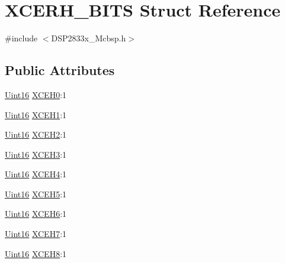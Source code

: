 \hypertarget{struct_x_c_e_r_h___b_i_t_s}{}\section{X\+C\+E\+R\+H\+\_\+\+B\+I\+T\+S Struct Reference}
\label{struct_x_c_e_r_h___b_i_t_s}


{\ttfamily \#include $<$D\+S\+P2833x\+\_\+\+Mcbsp.\+h$>$}

\subsection*{Public Attributes}
\begin{DoxyCompactItemize}
\item 
\hyperlink{_d_s_p2833x___device_8h_a59a9f6be4562c327cbfb4f7e8e18f08b}{Uint16} \hyperlink{struct_x_c_e_r_h___b_i_t_s_ad0342e8bd35c87b15a527aa268030c54}{X\+C\+E\+H0}\+:1
\item 
\hyperlink{_d_s_p2833x___device_8h_a59a9f6be4562c327cbfb4f7e8e18f08b}{Uint16} \hyperlink{struct_x_c_e_r_h___b_i_t_s_a704810aeec0e508faffb1348b2a2c13f}{X\+C\+E\+H1}\+:1
\item 
\hyperlink{_d_s_p2833x___device_8h_a59a9f6be4562c327cbfb4f7e8e18f08b}{Uint16} \hyperlink{struct_x_c_e_r_h___b_i_t_s_a83262ec8531262f849cb4bcf2aecf24a}{X\+C\+E\+H2}\+:1
\item 
\hyperlink{_d_s_p2833x___device_8h_a59a9f6be4562c327cbfb4f7e8e18f08b}{Uint16} \hyperlink{struct_x_c_e_r_h___b_i_t_s_a58b19077363fb579fc56406a2c61d3a1}{X\+C\+E\+H3}\+:1
\item 
\hyperlink{_d_s_p2833x___device_8h_a59a9f6be4562c327cbfb4f7e8e18f08b}{Uint16} \hyperlink{struct_x_c_e_r_h___b_i_t_s_a6bb73949b5e9b7d15824051825657d62}{X\+C\+E\+H4}\+:1
\item 
\hyperlink{_d_s_p2833x___device_8h_a59a9f6be4562c327cbfb4f7e8e18f08b}{Uint16} \hyperlink{struct_x_c_e_r_h___b_i_t_s_adc58c9decb6bb289603a70e4c91ce922}{X\+C\+E\+H5}\+:1
\item 
\hyperlink{_d_s_p2833x___device_8h_a59a9f6be4562c327cbfb4f7e8e18f08b}{Uint16} \hyperlink{struct_x_c_e_r_h___b_i_t_s_a95d68c48d6bb8d6f0c75c4674bef29f9}{X\+C\+E\+H6}\+:1
\item 
\hyperlink{_d_s_p2833x___device_8h_a59a9f6be4562c327cbfb4f7e8e18f08b}{Uint16} \hyperlink{struct_x_c_e_r_h___b_i_t_s_a42b09cb7e154e45e86fb6e624ce94277}{X\+C\+E\+H7}\+:1
\item 
\hyperlink{_d_s_p2833x___device_8h_a59a9f6be4562c327cbfb4f7e8e18f08b}{Uint16} \hyperlink{struct_x_c_e_r_h___b_i_t_s_aef3ba0fe4adb2869aee72322c3dc99ef}{X\+C\+E\+H8}\+:1

\end{DoxyCompactItemize}
